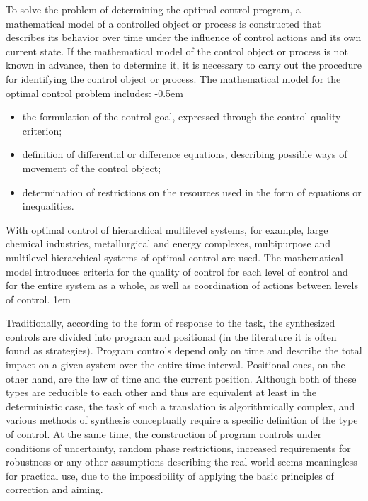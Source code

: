     To solve the problem of determining the optimal control program, a mathematical model of a controlled object or process is constructed that describes its behavior over time under the influence of control actions and its own current state.
    If the mathematical model of the control object or process is not known in advance, then to determine it, it is necessary to carry out the procedure for identifying the control object or process.
    The mathematical model for the optimal control problem includes:
    \parskip -0.5em
    \begin{itemize}
        \item the formulation of the control goal, expressed through the control quality criterion;
        \item definition of differential or difference equations, describing possible ways of movement of the control object;
        \item determination of restrictions on the resources used in the form of equations or inequalities.
    \end{itemize}
    With optimal control of hierarchical multilevel systems, for example, large chemical industries, metallurgical and energy complexes, multipurpose and multilevel hierarchical systems of optimal control are used.
    The mathematical model introduces criteria for the quality of control for each level of control and for the entire system as a whole, as well as coordination of actions between levels of control.
    \parskip 1em

    Traditionally, according to the form of response to the task, the synthesized controls are divided into program and positional (in the literature it is often found as strategies).
    Program controls depend only on time and describe the total impact on a given system over the entire time interval.
    Positional ones, on the other hand, are the law of time and the current position.
    Although both of these types are reducible to each other and thus are equivalent at least in the deterministic case, the task of such a translation is algorithmically complex, and various methods of synthesis conceptually require a specific definition of the type of control.
    At the same time, the construction of program controls under conditions of uncertainty, random phase restrictions, increased requirements for robustness or any other assumptions describing the real world seems meaningless for practical use, due to the impossibility of applying the basic principles of correction and aiming. 

